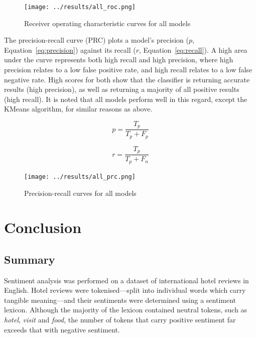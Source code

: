 \documentclass[12pt, a4paper]{pancake-article}
\begin{document}
\begin{figure}
  \begin{center}
    \texttt{[image: ../results/all\_roc.png]}
  \end{center}
  \caption{Receiver operating characteristic curves for all models}\label{fig:roc-all}
\end{figure}

The precision-recall curve (PRC) plots a model's precision ($p$, Equation~\ref{eq:precision})
against its recall ($r$, Equation~\ref{eq:recall}). A high area under the curve represents both high recall and high precision, where high precision relates to a low false positive rate, and high recall relates to a low false negative rate. High scores for both show that the classifier is returning accurate results (high precision), as well as returning a majority of all positive results (high recall). It is noted that all models perform well in this regard,
except the KMeans algorithm, for similar reasons as above.

\begin{equation}
  p = \frac{T_p}{T_p + F_p}
  \label{eq:precision}
\end{equation}

\begin{equation}
  r = \frac{T_p}{T_p + F_n} 
  \label{eq:recall}
\end{equation}

\begin{figure}
  \begin{center}
    \texttt{[image: ../results/all\_prc.png]}
  \end{center}
  \caption{Precision-recall curves for all models}\label{fig:prc-all}
\end{figure}

\section{Conclusion}

\subsection{Summary}

Sentiment analysis was performed on a dataset of international hotel reviews
in English. Hotel reviews were tokenised---split into individual words which
carry tangible meaning---and their sentiments were determined using a sentiment
lexicon. Although the majority of the lexicon contained neutral tokens,
such as \textit{hotel}, \textit{visit} and \textit{food}, the number of tokens
that carry positive sentiment far exceeds that with negative sentiment.
\end{document}
